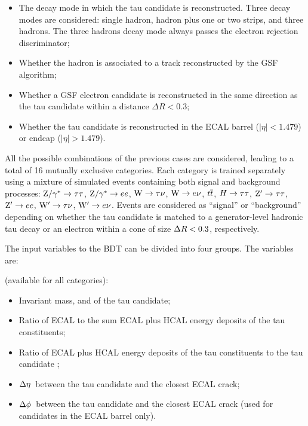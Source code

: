 \begin{itemize}
\item The decay mode in which the tau candidate is reconstructed. Three decay modes are considered: single hadron, hadron plus one or two strips, and three hadrons. The three hadrons decay mode always passes the electron rejection discriminator;
\item Whether the hadron is associated to a track reconstructed by the GSF algorithm;
\item Whether a GSF electron candidate is reconstructed in the same direction as the tau candidate within a distance $\Delta R < 0.3$;
\item Whether the tau candidate is reconstructed in the ECAL barrel ($|\eta| < 1.479$) or endcap ($|\eta| > 1.479$).
\end{itemize}

All the possible combinations of the previous cases are considered, leading to a total of 16 mutually exclusive categories. Each category is trained separately using a mixture of  simulated events containing both signal and background processes: $\mathrm{Z}/\gamma^*\rightarrow\tau\tau$, $\mathrm{Z}/\gamma^*\rightarrow ee$, $\mathrm{W}\rightarrow \tau\nu$, $\mathrm{W}\rightarrow e\nu$, $t\overline{t}$, $H\rightarrow\tau\tau$, $\mathrm{Z}'\rightarrow\tau\tau$, $\mathrm{Z}'\rightarrow ee$, $\mathrm{W}'\rightarrow \tau\nu$, $\mathrm{W}'\rightarrow e\nu$. Events are considered as ``signal'' or ``background'' depending on whether the tau candidate is matched to a generator-level hadronic tau decay or an electron within a cone of size $\Delta R < 0.3$, respectively. 

The input variables to the BDT can be divided into four groups. The variables are:

 (available for all categories):
\begin{itemize}
\item Invariant mass, \pT and \Eta of the tau candidate;
\item Ratio of ECAL to the sum ECAL plus HCAL energy deposits of the tau constituents;
\item Ratio of ECAL plus HCAL energy deposits of the tau constituents to the tau candidate \pT;
\item $\Delta\eta$\ between the tau candidate and the closest ECAL crack;
\item $\Delta\phi$\ between the tau candidate and the closest ECAL crack (used for candidates in the ECAL barrel only).
\end{itemize}

